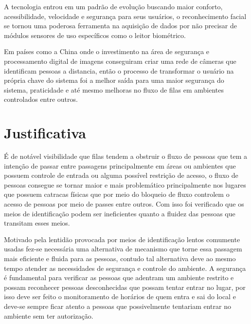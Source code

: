 \documentclass[conference,compsoc]{IEEEtran}
\begin{document}

A tecnologia entrou em um padrão de evolução buscando maior conforto, acessibilidade, velocidade e segurança
para seus usuários, o reconhecimento facial se tornou uma poderosa ferramenta na aquisição de dados por 
não precisar de módulos sensores de uso específicos como o leitor biométrico. 

Em países como a China onde o investimento na área de segurança e processamento digital de imagens conseguiram criar uma rede de câmeras que identificam pessoas a distancia, então o processo de transformar o usuário na própria chave do sistema
foi a melhor saída para uma maior segurança do sistema, praticidade e até mesmo melhoras no fluxo de filas em 
ambientes controlados entre outros.\cite{referencia:4} \cite{referencia:5} 
\section{Justificativa}
É de notável visibilidade que filas tendem a obstruir o fluxo de pessoas que tem a intenção de passar entre passagens principalmente em áreas ou ambientes que possuem controle de entrada ou alguma possível restrição de acesso, o fluxo de pessoas consegue se tornar maior e mais problemático
principalmente nos lugares que possuem catracas físicas que por meio do bloqueio de fluxo controlem o acesso de pessoas por meio de passes entre outros. Com isso foi verificado que
os meios de identificação podem ser ineficientes quanto a fluidez das
pessoas que transitam esses meios.

Motivado pela lentidão provocada por meios de identificação lentos comumente usadas fez-se necessária uma alternativa de mecanismo que torne essa passagem mais eficiente e fluida para as pessoas, contudo tal alternativa deve ao mesmo tempo atender as necessidades de segurança e controle do ambiente. A segurança é fundamental para verificar as pessoas que adentram um ambiente restrito e possam reconhecer pessoas desconhecidas que possam tentar entrar no lugar, por isso deve ser feito o monitoramento de horários de quem entra e sai do local e deve-se sempre ficar atento a pessoas que possivelmente tentariam entrar no ambiente sem ter autorização.
\end{document}
